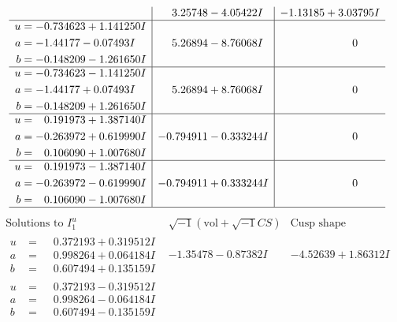 \documentclass[1p]{elsarticle_modified}
\theoremstyle{definition}
\newcommand{\I}{\sqrt{-1}}
\begin{document}
$$\begin{array}{c|c|c}
 & \phantom{-}3.25748 - 4.05422 I & -1.13185 + 3.03795 I \\ \hline\begin{aligned}
u &= -0.734623 + 1.141250 I \\
a &= -1.44177 - 0.07493 I \\
b &= -0.148209 - 1.261650 I\end{aligned}
 & \phantom{-}5.26894 - 8.76068 I & \phantom{-0.000000 } 0 \\ \hline\begin{aligned}
u &= -0.734623 - 1.141250 I \\
a &= -1.44177 + 0.07493 I \\
b &= -0.148209 + 1.261650 I\end{aligned}
 & \phantom{-}5.26894 + 8.76068 I & \phantom{-0.000000 } 0 \\ \hline\begin{aligned}
u &= \phantom{-}0.191973 + 1.387140 I \\
a &= -0.263972 + 0.619990 I \\
b &= \phantom{-}0.106090 + 1.007680 I\end{aligned}
 & -0.794911 - 0.333244 I & \phantom{-0.000000 } 0 \\ \hline\begin{aligned}
u &= \phantom{-}0.191973 - 1.387140 I \\
a &= -0.263972 - 0.619990 I \\
b &= \phantom{-}0.106090 - 1.007680 I\end{aligned}
 & -0.794911 + 0.333244 I & \phantom{-0.000000 } 0\\
 \hline 
 \end{array}$$\newpage$$\begin{array}{c|c|c}  
\text{Solutions to }I^u_{1}& \I (\text{vol} + \sqrt{-1}CS) & \text{Cusp shape}\\
 \hline 
\begin{aligned}
u &= \phantom{-}0.372193 + 0.319512 I \\
a &= \phantom{-}0.998264 + 0.064184 I \\
b &= \phantom{-}0.607494 + 0.135159 I\end{aligned}
 & -1.35478 - 0.87382 I & -4.52639 + 1.86312 I \\ \hline\begin{aligned}
u &= \phantom{-}0.372193 - 0.319512 I \\
a &= \phantom{-}0.998264 - 0.064184 I \\
b &= \phantom{-}0.607494 - 0.135159 I\end{aligned}

\end{array}$$
\end{document}
